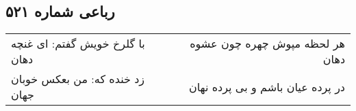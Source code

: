 \begin{center}
\section*{رباعی شماره ۵۲۱}
\label{sec:sh521}
\begin{longtable}{l p{0.5cm} r}
با گلرخ خویش گفتم: ای غنچه دهان
&&
هر لحظه مپوش چهره چون عشوه دهان
\\
زد خنده که: من بعکس خوبان جهان
&&
در پرده عیان باشم و بی پرده نهان
\\
\end{longtable}
\end{center}
